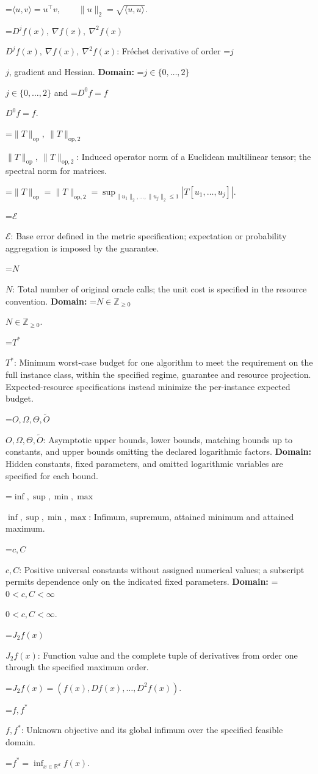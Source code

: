 \documentclass[10pt,a4paper]{article}
\newcommand{\AtlasMath}[1]{\par\begingroup\centering\setbox0=\hbox{$\displaystyle #1$}\ifdim\wd0>1.4\linewidth\typeout{ATLAS WIDE FORMULA: \the\wd0}\fi\ifdim\wd0>\linewidth\resizebox{\linewidth}{!}{\box0}\else\box0\fi\par\endgroup}
\newcommand{\AtlasInlineMath}[1]{\begingroup\setbox0=\hbox{$#1$}\ifdim\wd0>.4\linewidth\endgroup\AtlasMath{#1}\else\endgroup$#1$\fi}
\begin{document}
\AtlasMath{\langle u,v\rangle=u^\top v,\qquad\|u\|_2=\sqrt{\langle u,u\rangle}.}


\AtlasInlineMath{D^jf(x),\ \nabla f(x),\ \nabla^2f(x)}: Fréchet derivative of order \AtlasInlineMath{j}, gradient and Hessian. \textbf{Domain:} \AtlasInlineMath{j\in\{0,\ldots,2\}} and \AtlasInlineMath{D^0f=f}.

\AtlasInlineMath{\|T\|_{\mathrm{op}},\ \|T\|_{\mathrm{op},2}}: Induced operator norm of a Euclidean multilinear tensor; the spectral norm for matrices.


\AtlasMath{\|T\|_{\mathrm{op}}=\|T\|_{\mathrm{op},2}=\sup_{\|u_1\|_2,\ldots,\|u_j\|_2\le1}|T[u_1,\ldots,u_j]|.}


\AtlasInlineMath{\mathcal{E}}: Base error defined in the metric specification; expectation or probability aggregation is imposed by the guarantee.

\AtlasInlineMath{N}: Total number of original oracle calls; the unit cost is specified in the resource convention. \textbf{Domain:} \AtlasInlineMath{N\in\mathbb{Z}_{\ge0}}.

\AtlasInlineMath{T^*}: Minimum worst-case budget for one algorithm to meet the requirement on the full instance class, within the specified regime, guarantee and resource projection. Expected-resource specifications instead minimize the per-instance expected budget.

\AtlasInlineMath{O,\Omega,\Theta,\widetilde{O}}: Asymptotic upper bounds, lower bounds, matching bounds up to constants, and upper bounds omitting the declared logarithmic factors. \textbf{Domain:} Hidden constants, fixed parameters, and omitted logarithmic variables are specified for each bound.

\AtlasInlineMath{\inf,\sup,\min,\max}: Infimum, supremum, attained minimum and attained maximum.

\AtlasInlineMath{c,C}: Positive universal constants without assigned numerical values; a subscript permits dependence only on the indicated fixed parameters. \textbf{Domain:} \AtlasInlineMath{0<c,C<\infty}.

\AtlasInlineMath{J_{2}f(x)}: Function value and the complete tuple of derivatives from order one through the specified maximum order.


\AtlasMath{J_{2}f(x)=(f(x),Df(x),\ldots,D^{2}f(x)).}


\AtlasInlineMath{f,f^*}: Unknown objective and its global infimum over the specified feasible domain.


\AtlasMath{f^*=\inf_{x\in \mathbb{R}^d}f(x).}
\end{document}
